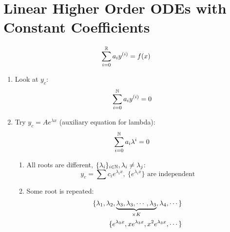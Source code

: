 \documentclass[Maths.tex]{subfiles}
\begin{document}
\section{Linear Higher Order ODEs with Constant Coefficients}
\begin{equation*}
    \sum_{i = 0}^{\mathbb{R}} a_i y^{(i)} = f(x)
\end{equation*}
\begin{enumerate}
    \item Look at $y_c$:
        \begin{equation*}
            \sum_{i=0}^{\mathbb{N}} a_i y^{(i)} = 0
        \end{equation*}
    \item Try $y_c = Ae^{\lambda x}$ (auxiliary equation for lambda):
        \begin{equation*}
            \sum_{i=0}^{\mathbb{N}} a_i \lambda^i = 0
        \end{equation*}
    \begin{enumerate}
        \item All roots are different, $\{\lambda_i\}_{i \in \mathbb{N}}, \lambda_i \neq \lambda_j$:
            \begin{equation*}
                y_c = \sum c_i e^{\lambda_i x}, ~ \{e^{\lambda_i x}\}\text{ are independent}
            \end{equation*}
        \item Some root is repeated:
            \begin{align*}
                \{\lambda_1,\lambda_2,\underbrace{\lambda_3,\lambda_3,\cdots,\lambda_3}_{\times K},\lambda_4,\cdots\} \\
                \{e^{\lambda_3 x},xe^{\lambda_3 x},x^2e^{\lambda_3 x},\cdots\}
            \end{align*}
    \end{enumerate}
\end{enumerate}
\end{document}
